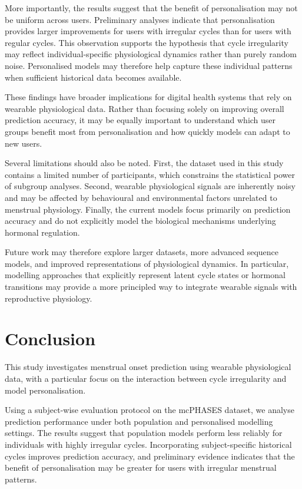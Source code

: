 \documentclass[conference]{IEEEtran}
\begin{document}
More importantly, the results suggest that the benefit of personalisation may not be uniform across users. Preliminary analyses indicate that personalisation provides larger improvements for users with irregular cycles than for users with regular cycles. This observation supports the hypothesis that cycle irregularity may reflect individual-specific physiological dynamics rather than purely random noise. Personalised models may therefore help capture these individual patterns when sufficient historical data becomes available.

These findings have broader implications for digital health systems that rely on wearable physiological data. Rather than focusing solely on improving overall prediction accuracy, it may be equally important to understand which user groups benefit most from personalisation and how quickly models can adapt to new users.

Several limitations should also be noted. First, the dataset used in this study contains a limited number of participants, which constrains the statistical power of subgroup analyses. Second, wearable physiological signals are inherently noisy and may be affected by behavioural and environmental factors unrelated to menstrual physiology. Finally, the current models focus primarily on prediction accuracy and do not explicitly model the biological mechanisms underlying hormonal regulation.

Future work may therefore explore larger datasets, more advanced sequence models, and improved representations of physiological dynamics. In particular, modelling approaches that explicitly represent latent cycle states or hormonal transitions may provide a more principled way to integrate wearable signals with reproductive physiology.

\section{Conclusion}

This study investigates menstrual onset prediction using wearable physiological data, with a particular focus on the interaction between cycle irregularity and model personalisation.

Using a subject-wise evaluation protocol on the mcPHASES dataset, we analyse prediction performance under both population and personalised modelling settings. The results suggest that population models perform less reliably for individuals with highly irregular cycles. Incorporating subject-specific historical cycles improves prediction accuracy, and preliminary evidence indicates that the benefit of personalisation may be greater for users with irregular menstrual patterns.
\end{document}
